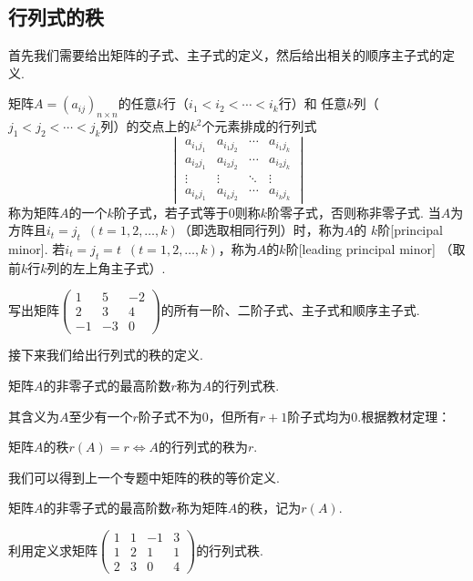 \subsection{行列式的秩}
首先我们需要给出矩阵的子式、主子式的定义，然后给出相关的顺序主子式的定义.
\begin{definition}
    矩阵$A=(a_{ij})_{n \times n}$的任意$k$行（$i_1<i_2<\cdots<i_k$行）和
    任意$k$列（$j_1<j_2<\cdots<j_k$列）的交点上的$k^2$个元素排成的行列式
    \[\begin{vmatrix}
        a_{i_1j_1} & a_{i_1j_2} & \cdots & a_{i_1j_k} \\
        a_{i_2j_1} & a_{i_2j_2} & \cdots & a_{i_2j_k} \\
        \vdots & \vdots & \ddots  & \vdots \\
        a_{i_kj_1} & a_{i_kj_2} & \cdots & a_{i_kj_k}
    \end{vmatrix}\]
    称为矩阵$A$的一个$k$阶子式，若子式等于0则称$k$阶零子式，否则称非零子式.
    当$A$为方阵且$i_t=j_t\enspace(t=1,2,\ldots,k)$（即选取相同行列）时，称为$A$的
    $k$阶[principal minor]. 若$i_t=j_t=t\enspace(t=1,2,\ldots,k)$，称为$A$的$k$阶[leading principal minor]
    （取前$k$行$k$列的左上角主子式）.
\end{definition}
\begin{example}
    写出矩阵$\begin{pmatrix}
        1 & 5 & -2 \\ 2 & 3 & 4 \\ -1 & -3 & 0
    \end{pmatrix}$的所有一阶、二阶子式、主子式和顺序主子式.
\end{example}
接下来我们给出行列式的秩的定义.
\begin{definition}
    矩阵$A$的非零子式的最高阶数$r$称为$A$的行列式秩.
\end{definition}
\raggedright 其含义为$A$至少有一个$r$阶子式不为0，但所有$r+1$阶子式均为0.根据教材定理：
\begin{theorem}
    矩阵$A$的秩$r(A)=r \iff A$的行列式的秩为$r$.
\end{theorem}
\raggedright 我们可以得到上一个专题中矩阵的秩的等价定义.
\begin{definition}
    矩阵$A$的非零子式的最高阶数$r$称为矩阵$A$的秩，记为$r(A)$.
\end{definition}
\begin{example}
    利用定义求矩阵$\begin{pmatrix}
        1 & 1 & -1 & 3 \\ 1 & 2 & 1 & 1 \\ 2 & 3 & 0 & 4
    \end{pmatrix}$的行列式秩.
\end{example}
\begin{solution}

\end{solution}

